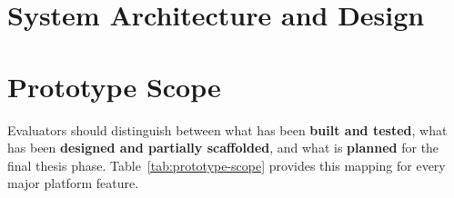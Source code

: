 \documentclass[acmsmall,screen,review]{acmart}
\begin{document}
\section{System Architecture and Design}

\section{Prototype Scope}
\label{sec:prototype-scope}

Evaluators should distinguish between what has been \textbf{built and tested}, what has been \textbf{designed and partially scaffolded}, and what is \textbf{planned} for the final thesis phase. Table~\ref{tab:prototype-scope} provides this mapping for every major platform feature.
\end{document}
